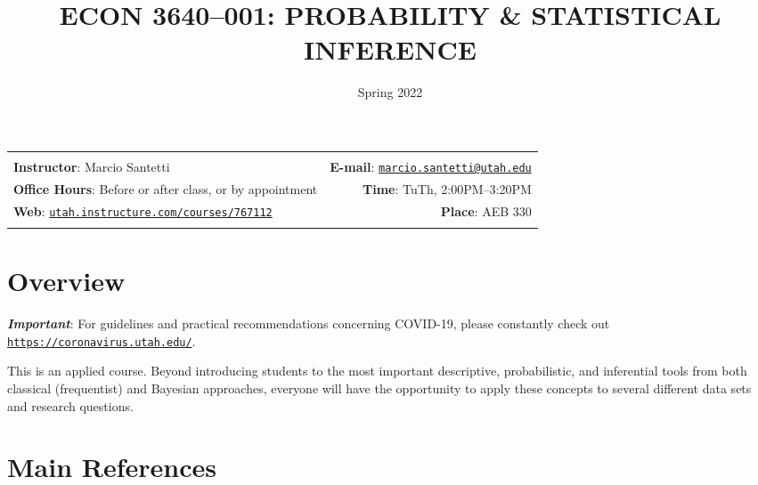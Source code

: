 \documentclass[11pt,]{article}
\title{\textbf{ECON 3640--001: PROBABILITY \& STATISTICAL INFERENCE}}
\date{Spring 2022}
\begin{document}
		\maketitle
	

		\thispagestyle{firststyle}



  	\noindent \begin{tabular*}{\textwidth}{ @{\extracolsep{\fill}} lr @{\extracolsep{\fill}}}

  \hline
  \\



\textbf{Instructor}: Marcio
Santetti & \textbf{E-mail}: \texttt{\href{mailto:marcio.santetti@utah.edu}{\nolinkurl{marcio.santetti@utah.edu}}}\\
\textbf{Office Hours}: Before or after class, or by
appointment  &  \textbf{Time}: TuTh, 2:00PM--3:20PM\\
\textbf{Web}: \href{http://utah.instructure.com/courses/767112}{\tt utah.instructure.com/courses/767112}  & \textbf{Place}: AEB
330\\
	&  \\
	\hline
	\end{tabular*}

\vspace{2mm}



\hypertarget{overview}{%
\section{Overview}\label{overview}}

\textbf{\emph{Important}}: For guidelines and practical recommendations
concerning COVID-19, please constantly check out
\href{https://coronavirus.utah.edu/}{\texttt{https://coronavirus.utah.edu/}}.

This is an applied course. Beyond introducing students to the most
important descriptive, probabilistic, and inferential tools from both
classical (frequentist) and Bayesian approaches, everyone will have the
opportunity to apply these concepts to several different data sets and
research questions.

\vspace{.2cm}

\hypertarget{main-references}{%
\section{Main References}\label{main-references}}
\end{document}
